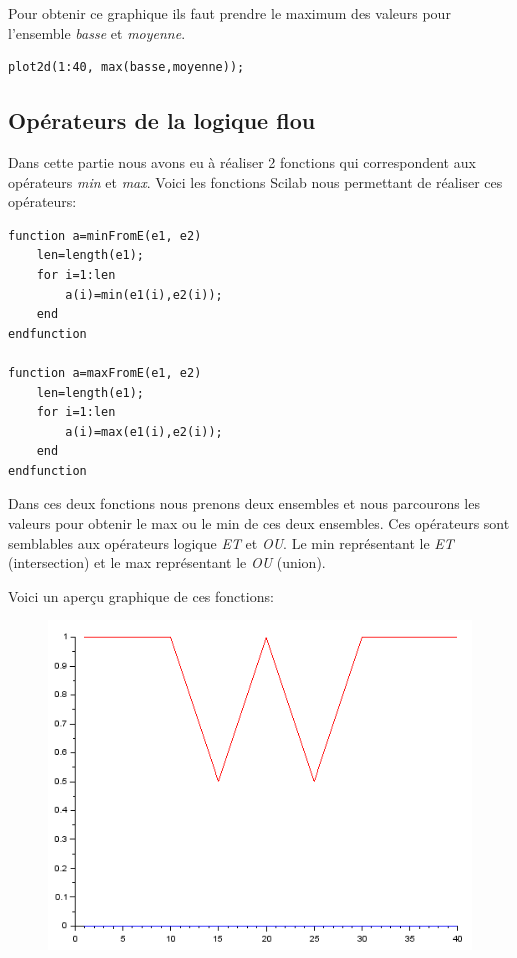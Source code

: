 \documentclass[a4paper,12pt]{report}
\begin{document}
Pour obtenir ce graphique ils faut prendre le maximum des valeurs pour l'ensemble \textit{basse} et \textit{moyenne}.

\begin{lstlisting}[style=Scilab,caption={Code question 1.3},label=lst:e1q3]
    plot2d(1:40, max(basse,moyenne));
\end{lstlisting}

\newpage

\subsection*{Opérateurs de la logique flou}

Dans cette partie nous avons eu à réaliser 2 fonctions qui correspondent aux opérateurs \textit{min} et \textit{max}. Voici les fonctions Scilab nous permettant de réaliser ces opérateurs:

\begin{lstlisting}[style=Scilab,caption={Code question 2.1},label=lst:e2q1]    
function a=minFromE(e1, e2)
    len=length(e1);
    for i=1:len
        a(i)=min(e1(i),e2(i));
    end    
endfunction

function a=maxFromE(e1, e2)
    len=length(e1);
    for i=1:len
        a(i)=max(e1(i),e2(i));
    end
endfunction
\end{lstlisting}

Dans ces deux fonctions nous prenons deux ensembles et nous parcourons les valeurs pour obtenir le max ou le min de ces deux ensembles. Ces opérateurs sont semblables aux opérateurs logique \textit{ET} et \textit{OU}. Le min représentant le \textit{ET} (intersection) et le max représentant le \textit{OU} (union).

Voici un aperçu graphique de ces fonctions:

\begin{figure}[!ht]
	\center	
	\includegraphics[scale=0.8]{image/e2-q1.PNG}
\end{figure} 
\end{document}
